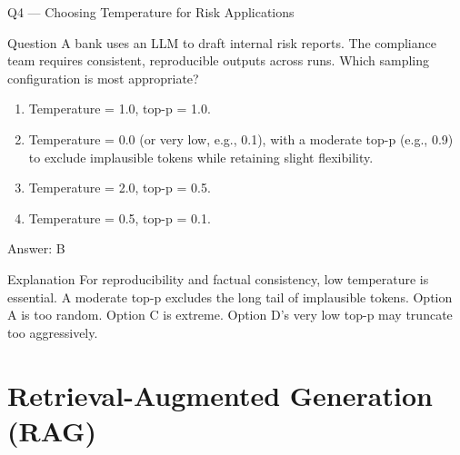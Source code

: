 \documentclass[aspectratio=169,8pt]{beamer}
\begin{document}
	\begin{frame}{Q4 --- Choosing Temperature for Risk Applications}
		\begin{block}{Question}
			A bank uses an LLM to draft internal risk reports. The compliance team requires consistent, reproducible outputs across runs. Which sampling configuration is most appropriate?
			\begin{enumerate}
				\item Temperature = 1.0, top-p = 1.0.
				\item Temperature = 0.0 (or very low, e.g., 0.1), with a moderate top-p (e.g., 0.9) to exclude implausible tokens while retaining slight flexibility.
				\item Temperature = 2.0, top-p = 0.5.
				\item Temperature = 0.5, top-p = 0.1.
			\end{enumerate}
		\end{block}
		\begin{exampleblock}{Answer: B}\end{exampleblock}
		\begin{block}{Explanation}
			For reproducibility and factual consistency, low temperature is essential. A moderate top-p excludes the long tail of implausible tokens. Option A is too random. Option C is extreme. Option D's very low top-p may truncate too aggressively.
		\end{block}
	\end{frame}
	
	\section{Retrieval-Augmented Generation (RAG)}
	
\end{document}
